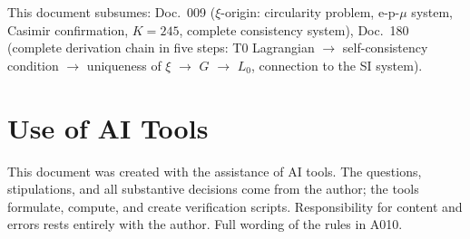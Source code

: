 This document subsumes: Doc.~009 ($\xi$-origin: circularity problem, e-p-$\mu$
system, Casimir confirmation, $K=245$, complete consistency system), Doc.~180
(complete derivation chain in five steps: T0 Lagrangian $\to$ self-consistency
condition $\to$ uniqueness of $\xi$ $\to$ $G$ $\to$ $L_0$, connection to the
SI system).

\section{Use of AI Tools}

This document was created with the assistance of AI tools. The questions,
stipulations, and all substantive decisions come from the author; the tools
formulate, compute, and create verification scripts.
Responsibility for content and errors rests entirely with the author.
Full wording of the rules in A010.
